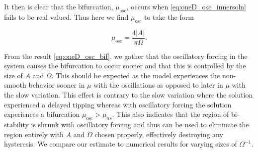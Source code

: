 It then is clear that the bifurcation, $\mu_{\text{osc}}$, occurs when \eqref{eq:oneD_osc_innersoln} fails to be real valued. Thus here we find $\mu_{\text{osc}}$ to take the form

\begin{equation}\label{eq:oneD_osc_bif}
\mu_{\text{osc}}=\frac{4|A|}{\pi \Omega}.
\end{equation}

From the result \eqref{eq:oneD_osc_bif}, we gather that the oscillatory forcing in the system causes the bifurcation to occur sooner and that this is controlled by the size of $A$ and $\Omega$. This should be expected as the model experiences the non-smooth behavior sooner in $\mu$ with the oscillations as opposed to later in $\mu$ with the slow variation. This effect is contrary to the slow variation where the solution experienced a delayed tipping whereas with oscillatory forcing the solution experiences a bifurcation $\mu_{\text{osc}}>\mu_{ns}$. This also indicates that the region of bi-stability is shrunk with oscillatory forcing and thus can be used to eliminate the region entirely with $A$ and $\Omega$ chosen properly, effectively destroying any hysteresis. We compare our estimate to numerical results for varying sizes of $\Omega^{-1}$.


